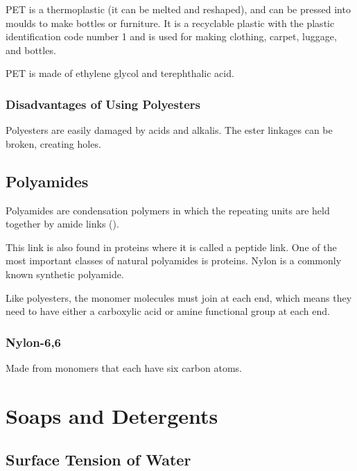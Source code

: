 			PET is a thermoplastic (it can be melted and reshaped), and can be pressed into moulds to make bottles or furniture. It is a recyclable plastic with the plastic identification code number 1 and is used for making clothing, carpet, luggage, and bottles.

			PET is made of ethylene glycol and terephthalic acid. 
		
		\subsubsection{Disadvantages of Using Polyesters}
		
			Polyesters are easily damaged by acids and alkalis. The ester linkages can be broken, creating holes.

	\subsection{Polyamides}
	
		Polyamides are condensation polymers in which the repeating units are held together by amide links ().

		\begin{center}
		\end{center}

		This link is also found in proteins where it is called a peptide link. One of the most important classes of natural polyamides is proteins. Nylon is a commonly known synthetic polyamide.

		Like polyesters, the monomer molecules must join at each end, which means they need to have either a carboxylic acid or amine functional group at each end.

		\subsubsection{Nylon-6,6}
		
			Made from monomers that each have six carbon atoms.

\section{Soaps and Detergents}

	\subsection{Surface Tension of Water}
	
